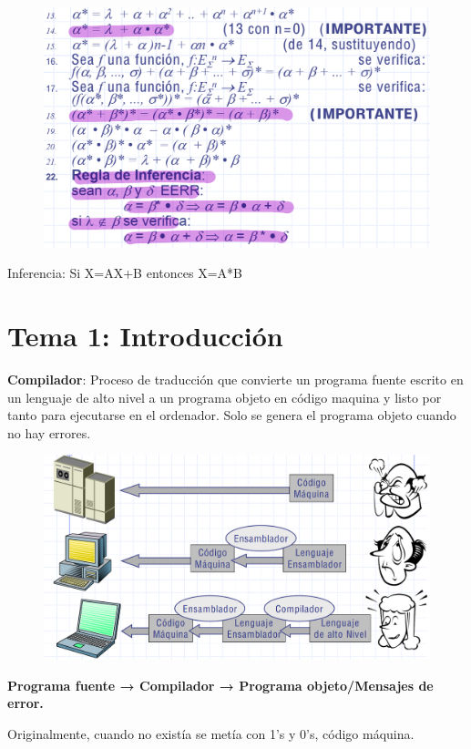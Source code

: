 \documentclass[12pt]{report} %
\begin{document}
\begin{figure}[H]
	{\includegraphics[scale=.3]{Untitled 7.png}}
\end{figure}

Inferencia: Si X=AX+B entonces X=A*B

\chapter{Tema 1: Introducción}

\textbf{Compilador}: Proceso de traducción que convierte un programa
fuente escrito en un lenguaje de alto nivel a un programa objeto en
código maquina y listo por tanto para ejecutarse en el ordenador. Solo
se genera el programa objeto cuando no hay errores.

\begin{figure}[H]
	{\includegraphics[scale=.25]{Untitled 8.png}}
\end{figure}

\textbf{Programa fuente → Compilador → Programa objeto/Mensajes de
error.}

Originalmente, cuando no existía se metía con 1's y 0's, código máquina.
\end{document}
